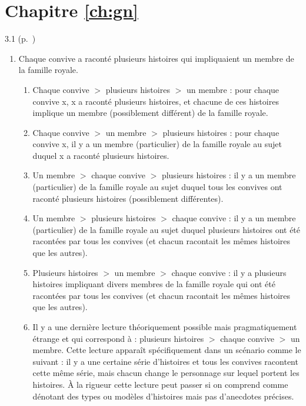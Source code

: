 \protect \section {Chapitre \protect \ref {ch:gn}}
\begin{Solution}{3.{1}}
(p.~\pageref{exo:3portee})\label{crg:3portee}
\begin{enumerate}
\item
Chaque convive a raconté plusieurs histoires qui impliquaient un
membre de la famille royale.

\begin{enumerate}
\item Chaque convive $>$ plusieurs histoires $>$ un membre :
pour chaque convive \Obj x, \Obj x a raconté plusieurs histoires, et chacune de ces histoires implique un membre (possiblement différent) de la famille royale.

\item Chaque convive $>$ un membre $>$ plusieurs histoires :
pour chaque convive \Obj x, il y a un membre (particulier) de la famille royale au sujet duquel \Obj x a raconté plusieurs histoires.

\item Un membre $>$ chaque convive $>$ plusieurs histoires :
il y a un membre (particulier) de la famille royale au sujet duquel tous les convives ont raconté plusieurs histoires (possiblement différentes).

\item Un membre $>$ plusieurs histoires $>$ chaque convive :
il y a un membre (particulier) de la famille royale au sujet duquel plusieurs histoires ont été racontées par tous les convives (et chacun racontait les mêmes histoires que les autres).

\item Plusieurs histoires $>$ un membre $>$ chaque convive :
il y a plusieurs histoires impliquant divers membres de la famille royale qui ont été racontées par tous les convives (et chacun racontait les mêmes histoires que les autres).

\sloppy
\item Il y a une dernière lecture théoriquement possible mais pragmatiquement étrange et qui correspond à : plusieurs histoires $>$ chaque convive $>$ un membre.  Cette lecture apparaît spécifiquement dans un scénario comme le suivant : il y a une certaine série d'histoires et tous les convives racontent cette même série, mais chacun change le personnage sur lequel portent les histoires.
  À la rigueur cette lecture peut passer si on comprend  comme dénotant des types ou modèles d'histoires mais pas d'anecdotes précises.


\end{enumerate}
\end{enumerate}
\end{Solution}
